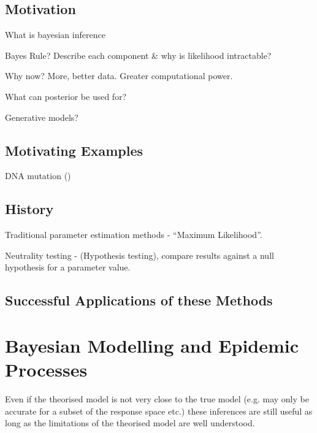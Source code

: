 \documentclass[11pt,a4paper]{article}
\theoremstyle{break}
\begin{document}
\subsection*{Motivation}\label{sec_motivation}

  \par What is bayesian inference
  \par Bayes Rule? Describe each component \& why is likelihood intractable?
  \par Why now? More, better data. Greater computational power.
  \par What can posterior be used for?
  \par Generative models?

\subsection*{Motivating Examples}\label{sec_motivating_examples}

  \par DNA mutation (\cite[]{modern_computational_approaches_for_analysing_molecular_genetic_variation_data})

\subsection*{History}\label{sec_history}

  \par Traditional parameter estimation methods - ``Maximum Likelihood''.
  \par Neutrality testing - (Hypothesis testing), compare results against a null hypothesis for a parameter value.

\subsection*{Successful Applications of these Methods}\label{sec_successful_applications}

\newpage
\section{Bayesian Modelling and Epidemic Processes}\label{sec_bayesian_modelling_and_epidemic_processes}

  \par Even if the theorised model is not very close to the true model (e.g. may only be accurate for a subset of the response space etc.) these inferences are still useful as long as the limitations of the theorised model are well understood. %
\end{document}
